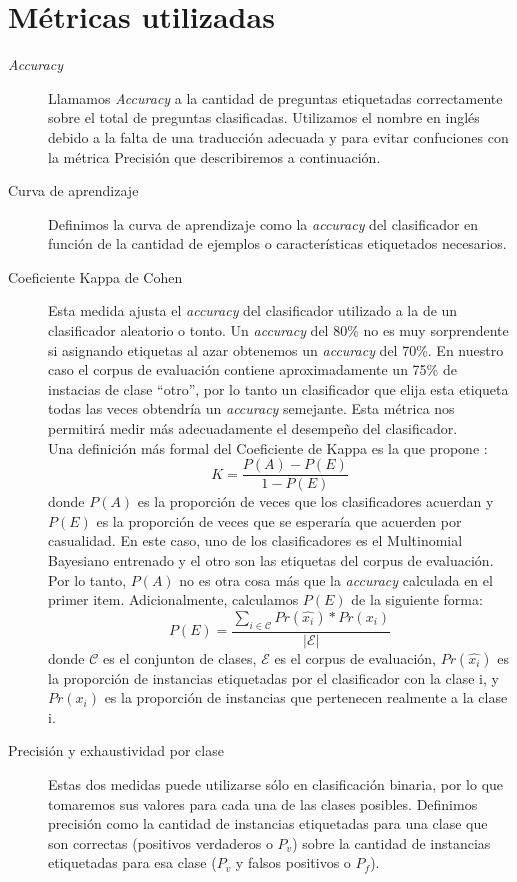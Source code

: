 \section{Métricas utilizadas}
\begin{description}
    \item[\textit{Accuracy}] Llamamos \textit{Accuracy} a la cantidad de preguntas etiquetadas correctamente sobre el total de preguntas clasificadas. Utilizamos el nombre en inglés debido a la falta de una traducción adecuada y para evitar confuciones con la métrica Precisión que describiremos a continuación.
    \item[Curva de aprendizaje] Definimos la curva de aprendizaje como la \textit{accuracy} del clasificador en función de la cantidad de ejemplos o características etiquetados necesarios.
    \item [Coeficiente Kappa de Cohen] Esta medida ajusta el \textit{accuracy} del clasificador utilizado a la de un clasificador aleatorio o tonto. Un \textit{accuracy} del 80\% no es muy sorprendente si asignando etiquetas al azar obtenemos un \textit{accuracy} del 70\%. En nuestro caso el corpus de evaluación contiene aproximadamente un 75\% de instacias de clase ``otro'', por lo tanto un clasificador que elija esta etiqueta todas las veces obtendría un \textit{accuracy} semejante. Esta métrica nos permitirá medir más adecuadamente el desempeño del clasificador.\\
    Una definición más formal del Coeficiente de Kappa es la que propone \citet{KappaCarletta}:
    $$K = \frac{P(A)-P(E)}{1-P(E)}$$
    donde $P(A)$ es la proporción de veces que los clasificadores acuerdan y $P(E)$ es la proporción de veces que se esperaría que acuerden por casualidad. En este caso, uno de los clasificadores es el Multinomial Bayesiano entrenado y el otro son las etiquetas del corpus de evaluación. Por lo tanto, $P(A)$ no es otra cosa más que la \textit{accuracy} calculada en el primer item. Adicionalmente, calculamos $P(E)$ de la siguiente forma:
    $$P(E) = \frac{\sum_{i\in\mathcal{C}}Pr(\hat{x_i})*Pr(x_i)}{|\mathcal{E}|}$$
    donde $\mathcal{C}$ es el conjunton de clases, $\mathcal{E}$ es el corpus de evaluación, $Pr(\hat{x_i})$ es la proporción de instancias etiquetadas por el clasificador con la clase i, y $Pr(x_i)$ es la proporción de instancias que pertenecen realmente a la clase i.
    \item [Precisión y exhaustividad por clase] Estas dos medidas puede utilizarse sólo en clasificación binaria, por lo que tomaremos sus valores para cada una de las clases posibles. Definimos precisión como la cantidad de instancias etiquetadas para una clase que son correctas (positivos verdaderos o $P_v$) sobre la cantidad de instancias etiquetadas para esa clase ($P_v$ y falsos positivos o $P_f$).

\end{description}
